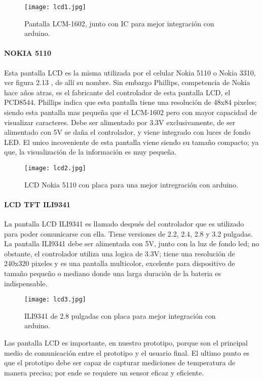 \begin{figure}[H]
	\centering
	\texttt{[image: lcd1.jpg]}
	\caption{Pantalla LCM-1602, junto con IC para mejor integración con arduino.}
\end{figure}

\paragraph{NOKIA 5110}
Esta pantalla LCD es la misma utilizada por el celular Nokia 5110 o Nokia 3310, ver figura 2.13 , de allí su nombre\cite{nokia1}. 
Sin embargo Phillips, competencia de Nokia hace años atras, es el fabricante del controlador de esta pantalla LCD, el PCD8544. Phillips indica que esta pantalla tiene una resolución de 48x84 pixeles; siendo esta pantalla mas pequeña que el LCM-1602 pero con mayor capacidad de visualizar caracteres\cite{nokia2}. Debe ser alimentado por 3.3V exclusivamente, de ser alimentado con 5V se daña el controlador, y viene integrado con luces de fondo LED\cite{nokia2}. El unico incoveniente de esta pantalla viene siendo su tamaño compacto; ya que, la visualización de la información es muy pequeña.

\begin{figure}[H]
	\centering
	\texttt{[image: lcd2.jpg]}
	\caption{LCD Nokia 5110 con placa para una mejor intregración con arduino.}
\end{figure}

\paragraph{LCD TFT ILI9341}
La pantalla LCD ILI9341 es llamado después del controlador que es utilizado para poder comunicarse con ella. Tiene versiones de 2.2, 2.4, 2.8 y 3.2 pulgadas. La pantalla ILI9341 debe ser alimentada con 5V, junto con la luz de fondo led; no obstante, el controlador utiliza una logica de 3.3V; tiene una resolución de 240x320 pixeles y es una pantalla multicolor, excelente para dispositivo de tamaño pequeño o mediano donde una larga duración de la bateria es indispensable\cite{ili9341}. 

\begin{figure}[H]
	\centering
	\texttt{[image: lcd3.jpg]}
	\caption{ILI9341 de 2.8 pulgadas con placa para mejor integración con arduino.}
\end{figure} 

\par \noindent
Las pantalla LCD es importante, en nuestro prototipo, porque son el principal medio de comunicación entre el prototipo y el usuario final. El ultimo punto es que el prototipo debe ser capaz de capturar mediciones de temperatura de manera precisa; por ende se requiere un sensor eficaz y eficiente.


